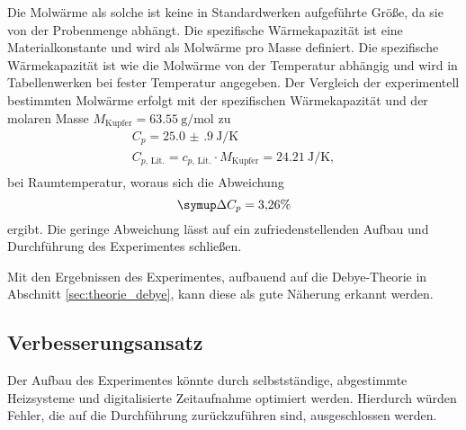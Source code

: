 Die Molwärme als solche ist keine in Standardwerken aufgeführte Größe, da sie von der Probenmenge abhängt.
Die spezifische Wärmekapazität ist eine Materialkonstante und wird als Molwärme pro Masse definiert.
Die spezifische Wärmekapazität ist wie die Molwärme von der Temperatur abhängig und wird in Tabellenwerken bei fester Temperatur angegeben.
Der Vergleich der experimentell bestimmten Molwärme erfolgt mit der spezifischen Wärmekapazität und der molaren Masse $M_{\text{Kupfer}}=\SI{63.55}{\gram\per\mol}$ zu
\begin{align}
	C_{p} =\SI{25.0(9)}{\joule\per\kelvin}\\
	C_{p,\,\text{Lit.}} = c_{p,\,\text{Lit.}}\cdot M_{\text{Kupfer}}= \SI{24.21}{\joule\per\kelvin},\\
\end{align}
bei Raumtemperatur, woraus sich die Abweichung
\begin{equation}
	\symup\Delta C_p = 3{,}26 \%
\end{equation}
ergibt.
Die geringe Abweichung lässt auf ein zufriedenstellenden Aufbau und Durchführung des Experimentes schließen.

Mit den Ergebnissen des Experimentes, aufbauend auf die Debye-Theorie in Abschnitt \ref{sec:theorie_debye}, 
kann diese als gute Näherung erkannt werden.

\subsection{Verbesserungsansatz}
Der Aufbau des Experimentes könnte durch selbstständige, abgestimmte Heizsysteme und digitalisierte Zeitaufnahme optimiert werden.
Hierdurch würden Fehler, die auf die Durchführung zurückzuführen sind, ausgeschlossen werden.
\newpage